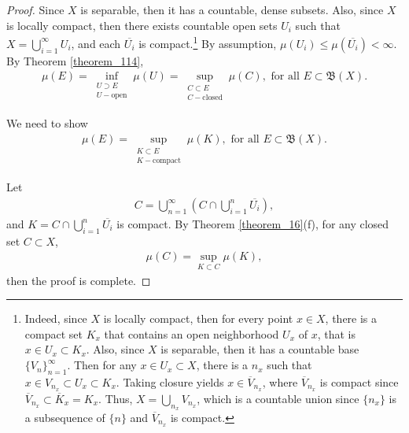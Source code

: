 \documentclass[11pt]{book}
\theoremstyle{definition}
\numberwithin{equation}{chapter}
\begin{document}
\begin{proof}
Since $X$ is separable, then it has a countable, dense subsets. Also, since $X$ is locally compact, then there exists countable open sets $U_i$ such that $X = \bigcup^\infty_{i=1} U_i$, and each $\overline{U_i}$ is compact.\footnote{Indeed, since $X$ is locally compact, then for every point $x \in X$, there is a compact set $K_x$ that contains an open neighborhood $U_x$ of $x$, that is $x \in U_x \subset K_x$. Also, since $X$ is separable, then it has a countable base $\{V_n \}^\infty_{n=1}$. Then for any $x \in U_x \subset X$, there is a $n_x$ such that $x \in V_{n_x} \subset U_x \subset K_x$. Taking closure yields $x \in \overline{V}_{n_x}$, where $\overline{V}_{n_x}$ is compact since $\overline{V}_{n_x} \subset \overline{K}_x = K_x$. Thus, $X = \bigcup_{n_x} V_{n_x}$, which is a countable union since $\{n_x\}$ is a subsequence of $\{n\}$ and $\overline{V}_{n_x}$ is compact.} By assumption, $\mu(U_i) \leq \mu(\overline{U_i}) < \infty$. By Theorem \ref{theorem_114},
\begin{align*}
    \mu(E) = \inf_{\substack{U \supset E\\ U - \text{open}}} \mu(U) = \sup_{\substack{C \subset E\\ C - \text{closed}}} \mu(C), \,\, \text{for all}\,\, E \subset \mathfrak{B}(X).
\end{align*}

We need to show 
\begin{align*}
    \mu(E) =  \sup_{\substack{K \subset E\\ K - \text{compact}}} \mu(K), \,\, \text{for all}\,\, E \subset \mathfrak{B}(X).
\end{align*}

Let 
\begin{align*}
    C = \bigcup^\infty_{n=1} \left(C \cap \bigcup^n_{i=1} \overline{U_i} \right),
\end{align*}
and $K = C \cap \bigcup^n_{i=1} \overline{U_i}$ is compact. By Theorem \ref{theorem_16}(f), for any closed set $C \subset X$,
\begin{align*}
    \mu(C) = \sup_{K \subset C} \mu(K),
\end{align*}
then the proof is complete.
\end{proof}

\medskip
\end{document}
